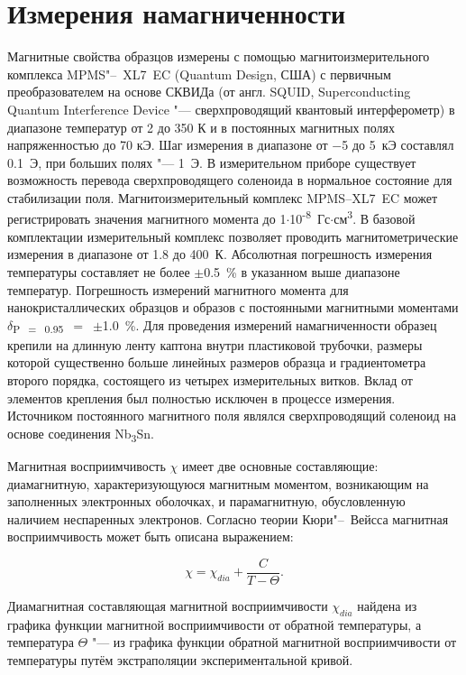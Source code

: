 \newpage
\section{Измерения намагниченности} \label{sect2_6}
Магнитные свойства образцов измерены с
помощью магнитоизмерительного комплекса
MPMS"--~XL7~EC (Quantum Design, США) с первичным преобразователем на основе СКВИДа (от англ. SQUID, Superconducting Quantum Interference Device "--- сверхпроводящий квантовый интерферометр) в диапазоне температур от 2 до 350 К и в постоянных магнитных полях напряженностью до 70 кЭ. Шаг измерения в диапазоне от $-$5 до 5~кЭ составлял 0.1~Э, при больших полях "--- 1~Э. В измерительном приборе существует возможность перевода сверхпроводящего соленоида в нормальное состояние для стабилизации поля.
Магнитоизмерительный комплекс MPMS--XL7~EC может регистрировать значения магнитного момента до 1$\cdot$10\textsuperscript{-8}~Гс$\cdot$см\textsuperscript{3}.
В базовой комплектации измерительный комплекс позволяет проводить магнитометрические измерения в диапазоне от 1.8 до 400~К.
Абсолютная погрешность измерения температуры составляет не более $\pm$0.5~\% в указанном выше диапазоне температур.
Погрешность измерений магнитного момента для нанокристаллических образцов и образов с постоянными магнитными моментами $\delta$\textsubscript{P~$=$~0.95}~$=$~$\pm$1.0~\%.
Для проведения измерений намагниченности образец крепили на длинную
ленту каптона внутри пластиковой трубочки, размеры которой существенно больше линейных размеров образца и градиентометра второго порядка,
состоящего из четырех измерительных витков.
Вклад от элементов крепления был полностью исключен в процессе измерения. Источником постоянного магнитного поля являлся сверхпроводящий
соленоид на основе соединения Nb\textsubscript{3}Sn.


Магнитная восприимчивость $\chi$ имеет две основные составляющие: диамагнитную, характеризующуюся магнитным моментом, возникающим на заполненных электронных оболочках, и парамагнитную, обусловленную наличием неспаренных электронов. Согласно теории Кюри"--~Вейсса магнитная
восприимчивость может быть описана выражением:

\begin{equation}
  \label{eq:equation2.1}
  \chi = \chi_{dia}+\frac{C}{T - \Theta}.
\end{equation}

Диамагнитная составляющая магнитной восприимчивости $\chi_{dia}$ найдена из графика функции
магнитной восприимчивости от обратной температуры, а температура $\Theta$ "--- из графика функции обратной магнитной восприимчивости от
температуры путём экстраполяции экспериментальной кривой.

